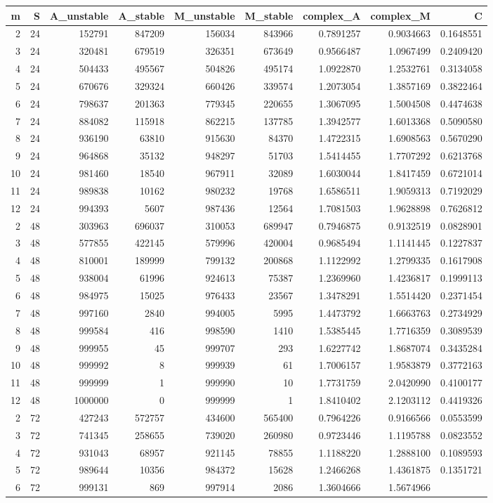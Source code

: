 \documentclass[]{article}
\begin{document}
\begin{longtable}[]{@{}rrrrrrrrr@{}}
\toprule
m & S & A\_unstable & A\_stable & M\_unstable & M\_stable & complex\_A &
complex\_M & C\tabularnewline
\midrule
\endhead
2 & 24 & 152791 & 847209 & 156034 & 843966 & 0.7891257 & 0.9034663 &
0.1648551\tabularnewline
3 & 24 & 320481 & 679519 & 326351 & 673649 & 0.9566487 & 1.0967499 &
0.2409420\tabularnewline
4 & 24 & 504433 & 495567 & 504826 & 495174 & 1.0922870 & 1.2532761 &
0.3134058\tabularnewline
5 & 24 & 670676 & 329324 & 660426 & 339574 & 1.2073054 & 1.3857169 &
0.3822464\tabularnewline
6 & 24 & 798637 & 201363 & 779345 & 220655 & 1.3067095 & 1.5004508 &
0.4474638\tabularnewline
7 & 24 & 884082 & 115918 & 862215 & 137785 & 1.3942577 & 1.6013368 &
0.5090580\tabularnewline
8 & 24 & 936190 & 63810 & 915630 & 84370 & 1.4722315 & 1.6908563 &
0.5670290\tabularnewline
9 & 24 & 964868 & 35132 & 948297 & 51703 & 1.5414455 & 1.7707292 &
0.6213768\tabularnewline
10 & 24 & 981460 & 18540 & 967911 & 32089 & 1.6030044 & 1.8417459 &
0.6721014\tabularnewline
11 & 24 & 989838 & 10162 & 980232 & 19768 & 1.6586511 & 1.9059313 &
0.7192029\tabularnewline
12 & 24 & 994393 & 5607 & 987436 & 12564 & 1.7081503 & 1.9628898 &
0.7626812\tabularnewline
2 & 48 & 303963 & 696037 & 310053 & 689947 & 0.7946875 & 0.9132519 &
0.0828901\tabularnewline
3 & 48 & 577855 & 422145 & 579996 & 420004 & 0.9685494 & 1.1141445 &
0.1227837\tabularnewline
4 & 48 & 810001 & 189999 & 799132 & 200868 & 1.1122992 & 1.2799335 &
0.1617908\tabularnewline
5 & 48 & 938004 & 61996 & 924613 & 75387 & 1.2369960 & 1.4236817 &
0.1999113\tabularnewline
6 & 48 & 984975 & 15025 & 976433 & 23567 & 1.3478291 & 1.5514420 &
0.2371454\tabularnewline
7 & 48 & 997160 & 2840 & 994005 & 5995 & 1.4473792 & 1.6663763 &
0.2734929\tabularnewline
8 & 48 & 999584 & 416 & 998590 & 1410 & 1.5385445 & 1.7716359 &
0.3089539\tabularnewline
9 & 48 & 999955 & 45 & 999707 & 293 & 1.6227742 & 1.8687074 &
0.3435284\tabularnewline
10 & 48 & 999992 & 8 & 999939 & 61 & 1.7006157 & 1.9583879 &
0.3772163\tabularnewline
11 & 48 & 999999 & 1 & 999990 & 10 & 1.7731759 & 2.0420990 &
0.4100177\tabularnewline
12 & 48 & 1000000 & 0 & 999999 & 1 & 1.8410402 & 2.1203112 &
0.4419326\tabularnewline
2 & 72 & 427243 & 572757 & 434600 & 565400 & 0.7964226 & 0.9166566 &
0.0553599\tabularnewline
3 & 72 & 741345 & 258655 & 739020 & 260980 & 0.9723446 & 1.1195788 &
0.0823552\tabularnewline
4 & 72 & 931043 & 68957 & 921145 & 78855 & 1.1188220 & 1.2888100 &
0.1089593\tabularnewline
5 & 72 & 989644 & 10356 & 984372 & 15628 & 1.2466268 & 1.4361875 &
0.1351721\tabularnewline
6 & 72 & 999131 & 869 & 997914 & 2086 & 1.3604666 & 1.5674966 &

\end{longtable}
\end{document}
